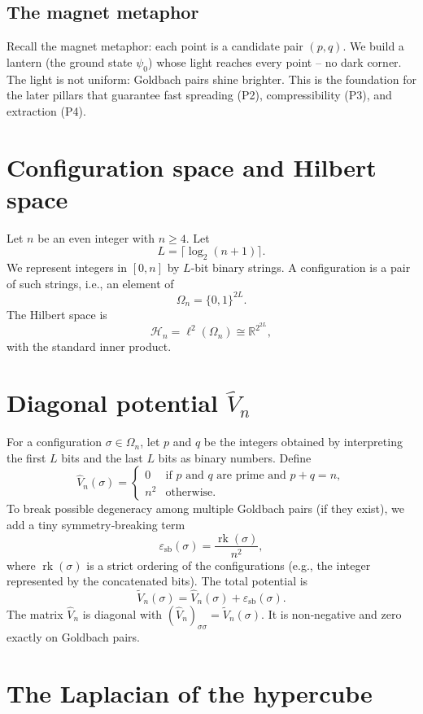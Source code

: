 \documentclass[11pt,a4paper]{article}
\begin{document}
\subsection{The magnet metaphor}

Recall the magnet metaphor: each point is a candidate pair \((p,q)\). We build a lantern (the ground state \(\psi_0\)) whose light reaches every point – no dark corner. The light is not uniform: Goldbach pairs shine brighter. This is the foundation for the later pillars that guarantee fast spreading (P2), compressibility (P3), and extraction (P4).

\section{Configuration space and Hilbert space}

Let \(n\) be an even integer with \(n \ge 4\). Let
\[
L = \lceil \log_2(n+1)\rceil.
\]
We represent integers in \([0,n]\) by \(L\)-bit binary strings. A configuration is a pair of such strings, i.e., an element of
\[
\Omega_n = \{0,1\}^{2L}.
\]
The Hilbert space is
\[
\mathcal{H}_n = \ell^2(\Omega_n) \cong \mathbb{R}^{2^{2L}},
\]
with the standard inner product.

\section{Diagonal potential \(\hat{V}_n\)}

For a configuration \(\sigma \in \Omega_n\), let \(p\) and \(q\) be the integers obtained by interpreting the first \(L\) bits and the last \(L\) bits as binary numbers. Define
\[
\hat{V}_n(\sigma) = 
\begin{cases}
0 & \text{if } p \text{ and } q \text{ are prime and } p+q = n,\\
n^2 & \text{otherwise}.
\end{cases}
\]
To break possible degeneracy among multiple Goldbach pairs (if they exist), we add a tiny symmetry‑breaking term
\[
\varepsilon_{\text{sb}}(\sigma) = \frac{\operatorname{rk}(\sigma)}{n^2},
\]
where \(\operatorname{rk}(\sigma)\) is a strict ordering of the configurations (e.g., the integer represented by the concatenated bits). The total potential is
\[
\tilde{V}_n(\sigma) = \hat{V}_n(\sigma) + \varepsilon_{\text{sb}}(\sigma).
\]
The matrix \(\hat{V}_n\) is diagonal with \((\hat{V}_n)_{\sigma\sigma} = \tilde{V}_n(\sigma)\). It is non‑negative and zero exactly on Goldbach pairs.

\section{The Laplacian of the hypercube}
\end{document}
